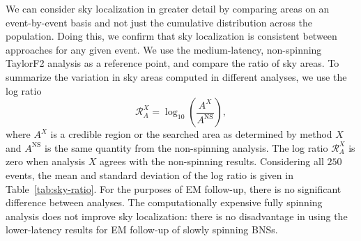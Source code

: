 We can consider sky localization in greater detail by comparing areas on an event-by-event basis and not just the cumulative distribution across the population. Doing this, we confirm that sky localization is consistent between approaches for any given event. We use the medium-latency, non-spinning TaylorF2 analysis as a reference point, and compare the ratio of sky areas. To summarize the variation in sky areas computed in different analyses, we use the log ratio
\begin{equation}
\mathcal{R}_A^X = \log_{10}\left(\frac{A^X}{A^\mathrm{NS}}\right),
\end{equation}
where $A^X$ is a credible region or the searched area as determined by method $X$ and $A^\mathrm{NS}$ is the same quantity from the non-spinning analysis. The log ratio $\mathcal{R}_A^X$ is zero when analysis $X$ agrees with the non-spinning results. Considering all $250$ events, the mean and standard deviation of the log ratio is given in Table~\ref{tab:sky-ratio}. For the purposes of EM follow-up, there is no significant difference between analyses. The computationally expensive fully spinning analysis does not improve sky localization: there is no disadvantage in using the lower-latency results for EM follow-up of slowly spinning BNSs.
  
  
  
  
  
  